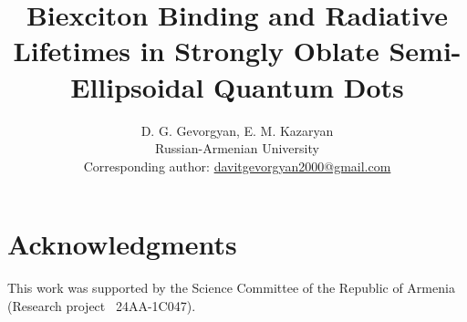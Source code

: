\documentclass[11pt,a4paper]{article}
\title{\textbf{Biexciton Binding and Radiative Lifetimes in Strongly Oblate
Semi-Ellipsoidal Quantum Dots}}
\author{D. G. Gevorgyan, E. M. Kazaryan\\
\small Russian-Armenian University\\
\small Corresponding author: \href{mailto:davitgevorgyan2000@gmail.com}{davitgevorgyan2000@gmail.com}}
\date{}
\begin{document}
\maketitle








\section*{Acknowledgments}
This work was supported by the Science Committee of the Republic of Armenia
(Research project \textnumero~24AA-1C047).




\clearpage
\appendix

\end{document}
